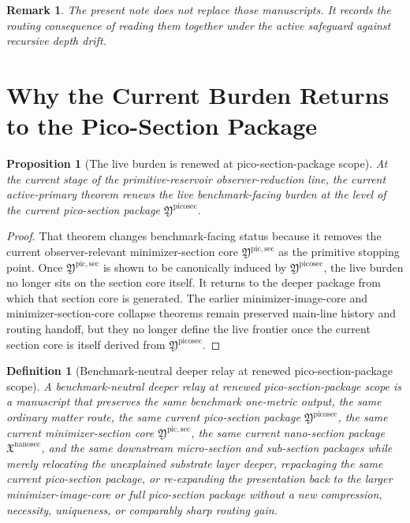 \documentclass[11pt]{article}
\newcommand{\NanoSectionPackage}{\mathfrak X^{\mathrm{nanosec}}}
\newcommand{\PicoSectionPackage}{\mathfrak Y^{\mathrm{picosec}}}
\newcommand{\PicoMinSectionCore}{\mathfrak Y^{\mathrm{pic,sec}}}
\newtheorem{definition}{Definition}
\newtheorem{proposition}{Proposition}
\newtheorem{remark}{Remark}
\begin{document}
\begin{remark}
The present note does not replace those manuscripts. It records the routing consequence of reading them together under the active safeguard against recursive depth drift.
\end{remark}

\section{Why the Current Burden Returns to the Pico-Section Package}

\begin{proposition}[The live burden is renewed at pico-section-package scope]
At the current stage of the primitive-reservoir observer-reduction line, the current active-primary theorem renews the live benchmark-facing burden at the level of the current pico-section package \(\PicoSectionPackage\).
\end{proposition}

\begin{proof}
That theorem changes benchmark-facing status because it removes the current observer-relevant minimizer-section core \(\PicoMinSectionCore\) as the primitive stopping point. Once \(\PicoMinSectionCore\) is shown to be canonically induced by \(\PicoSectionPackage\), the live burden no longer sits on the section core itself. It returns to the deeper package from which that section core is generated. The earlier minimizer-image-core and minimizer-section-core collapse theorems remain preserved main-line history and routing handoff, but they no longer define the live frontier once the current section core is itself derived from \(\PicoSectionPackage\).
\end{proof}

\begin{definition}[Benchmark-neutral deeper relay at renewed pico-section-package scope]
A \emph{benchmark-neutral deeper relay at renewed pico-section-package scope} is a manuscript that preserves the same benchmark one-metric output, the same ordinary matter route, the same current pico-section package \(\PicoSectionPackage\), the same current minimizer-section core \(\PicoMinSectionCore\), the same current nano-section package \(\NanoSectionPackage\), and the same downstream micro-section and sub-section packages while merely relocating the unexplained substrate layer deeper, repackaging the same current pico-section package, or re-expanding the presentation back to the larger minimizer-image-core or full pico-section package without a new compression, necessity, uniqueness, or comparably sharp routing gain.
\end{definition}
\end{document}
